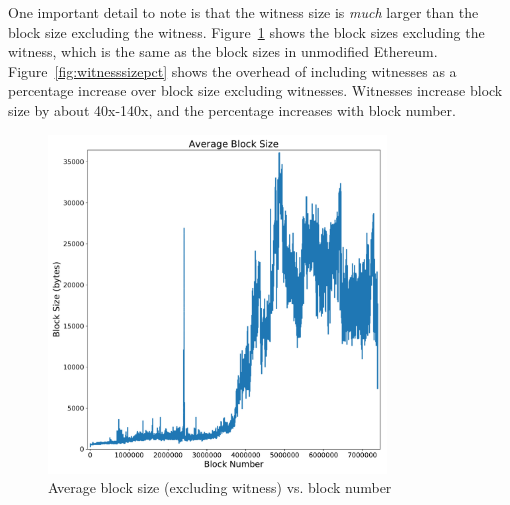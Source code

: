 \documentclass[12pt]{article}
\newcommand{\figurewidth}{0.8\textwidth}
\begin{document}
One important detail to note is that the witness size is \emph{much} larger than the block size excluding the witness. Figure~\ref{fig:blocksize} shows the block sizes excluding the witness, which is the same as the block sizes in unmodified Ethereum. Figure~\ref{fig:witnesssizepct} shows the overhead of including witnesses as a percentage increase over block size excluding witnesses. Witnesses increase block size by about 40x-140x, and the percentage increases with block number.

\begin{figure}[H]
  \centering
  \includegraphics[width=\figurewidth]{../figures/results/graphs/background/block-size.pdf}
  \caption{Average block size (excluding witness) vs. block number}
  \label{fig:blocksize}
\end{figure}
\end{document}
